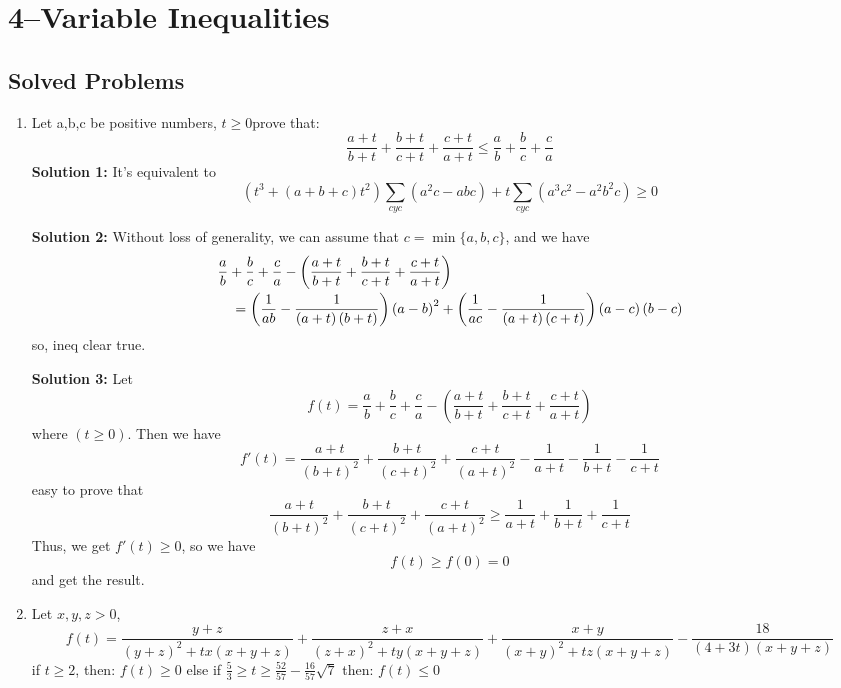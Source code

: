 \documentclass{report}
\begin{document}
\chapter{4--Variable Inequalities}
\section{Solved Problems}
\begin{enumerate}
	\item Let a,b,c be positive numbers, $ t \geq 0$prove that:$${\frac {a + t}{b + t}} + {\frac {b + t}{c + t}} + {\frac {c + t}{a + t}}\leq {\frac {a }{b}} + {\frac {b}{c}} + {\frac {c}{a}}$$
	\textbf{Solution 1:} It's equivalent to
	\[(t^3+(a+b+c)t^2)\sum_{cyc}(a^2c-abc)+t\sum_{cyc}(a^3c^2-a^2b^2c)\geq0\]
	\begin{flushright}
	\end{flushright}
	\textbf{Solution 2:} Without loss of generality, we can assume that $ c = \min\{a,b,c\}$, and we have\[\splitdfrac{\dfrac {a}{b} + \dfrac {b}{c} + \dfrac {c}{a} - \left( {\dfrac {{a + t}}{{b + t}} + \dfrac {{b + t}}{{c + t}} + \dfrac {{c + t}}{{a + t}}} \right)}{= \left( {\dfrac {1}{{ab}} - \dfrac {1}{{\left( {a + t} \right)\left( {b + t} \right)}}} \right)\left( {a - b} \right)^2 + \left( {\dfrac {1}{{ac}} - \dfrac {1}{{\left( {a + t} \right)\left( {c + t} \right)}}} \right)\left( {a - c} \right)\left( {b - c} \right)}\]so, ineq clear true.
	\begin{flushright}
	\end{flushright}
	\textbf{Solution 3:} Let$$ f(t) = \frac {a}{b} + \frac {b}{c} + \frac {c}{a} - \left( {\frac {{a + t}}{{b + t}} + \frac {{b + t}}{{c + t}} + \frac {{c + t}}{{a + t}}} \right)$$ where $(t \ge 0)$. Then we have$$ f'(t) = \frac {a + t}{(b + t)^2} + \frac {b + t}{(c + t)^2} + \frac {c + t}{(a + t)^2} - \frac {1}{a + t} - \frac {1}{b + t} - \frac {1}{c + t}$$easy to prove that$$ \frac {a + t}{(b + t)^2} + \frac {b + t}{(c + t)^2} + \frac {c + t}{(a + t)^2} \ge \frac {1}{a + t} + \frac {1}{b + t} + \frac {1}{c + t}$$Thus, we get $ f'(t) \ge 0$, so we have$$ f(t) \ge f(0) = 0$$and get the result.
	\begin{flushright}
	\end{flushright}
\item Let $ x,y,z > 0$, $$ f(t) = \frac {y + z}{(y + z)^2 + tx(x + y + z)} + \frac {z + x}{(z + x)^2 + ty(x + y + z)} + \frac {x + y}{(x + y)^2 + tz(x + y + z)} - \frac {18}{(4 + 3t)(x + y + z)}$$if $ t \geq 2$, then: $ f(t) \geq 0$ else if $ \frac {5}{3}\geq t\geq \frac {52}{57} - \frac {16}{57}\sqrt {7}$ then: $ f(t) \le 0$


\end{enumerate}
\end{document}
